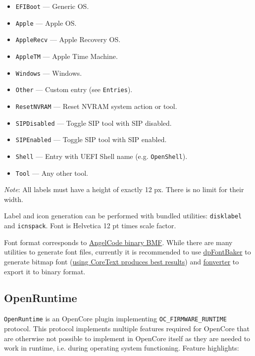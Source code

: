 \documentclass[]{article}
\makeatletter
\providecommand{\tightlist}{%
  \setlength{\itemsep}{0pt}\setlength{\parskip}{0pt}}
\renewcommand{\label}[1]{%
\zref@wrapper@immediate{\oldlabel{#1}}}  %
\makeatother
\begin{document}
\begin{itemize}
\tightlist
  \item \texttt{EFIBoot} --- Generic OS.
  \item \texttt{Apple} --- Apple OS.
  \item \texttt{AppleRecv} --- Apple Recovery OS.
  \item \texttt{AppleTM} --- Apple Time Machine.
  \item \texttt{Windows} --- Windows.
  \item \texttt{Other} --- Custom entry (see \texttt{Entries}).
  \item \texttt{ResetNVRAM} --- Reset NVRAM system action or tool.
  \item \texttt{SIPDisabled} --- Toggle SIP tool with SIP disabled.
  \item \texttt{SIPEnabled} --- Toggle SIP tool with SIP enabled.
  \item \texttt{Shell} --- Entry with UEFI Shell name (e.g. \texttt{OpenShell}).
  \item \texttt{Tool} --- Any other tool.
\end{itemize}

\emph{Note}: All labels must have a height of exactly 12 px. There is no limit for their width.

Label and icon generation can be performed with bundled utilities: \texttt{disklabel} and
\texttt{icnspack}. Font is Helvetica 12 pt times scale factor.

Font format corresponds to \href{https://www.angelcode.com/products/bmfont}{AngelCode binary BMF}.
While there are many utilities to generate font files, currently it is recommended to use
\href{https://github.com/danpla/dpfontbaker}{dpFontBaker} to generate bitmap font
(\href{https://github.com/danpla/dpfontbaker/pull/1}{using CoreText produces best results})
and \href{https://github.com/usr-sse2/fonverter}{fonverter} to export it to binary format.

\subsection{OpenRuntime}\label{uefiruntime}

\texttt{OpenRuntime} is an OpenCore plugin implementing \texttt{OC\_FIRMWARE\_RUNTIME} protocol.
This protocol implements multiple features required for OpenCore that are otherwise not possible
to implement in OpenCore itself as they are needed to work in runtime, i.e. during operating system
functioning. Feature highlights:
\end{document}
